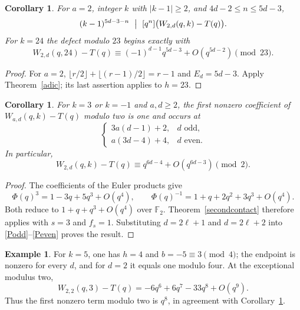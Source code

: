 \documentclass[11pt]{amsart}
\newtheorem{corollary}[theorem]{Corollary}
\theoremstyle{definition}
\newtheorem{example}[theorem]{Example}
\theoremstyle{remark}
\numberwithin{equation}{section}
\begin{document}
\begin{corollary}\label{leveltwoadic}
For $a=2$, integer $k$ with $|k-1|\ge2$, and $4d-2\le n\le5d-3$,
\[
 (k-1)^{5d-3-n}\ \bigm|\ [q^n]\bigl(W_{2,d}(q,k)-T(q)\bigr).
\]
For $k=24$ the defect modulo $23$ begins exactly with
\[
 W_{2,d}(q,24)-T(q)\equiv(-1)^{d-1}q^{5d-3}+O(q^{5d-2})\pmod{23}.
\]
\end{corollary}
\begin{proof}
For $a=2$, $\lfloor r/2\rfloor+\lfloor(r-1)/2\rfloor=r-1$ and $E_d=5d-3$. Apply Theorem~\ref{adic}; its last assertion applies to $h=23$.
\end{proof}

\begin{corollary}\label{modtwoendpoint}
For $k=3$ or $k=-1$ and $a,d\ge2$, the first nonzero coefficient of
$W_{a,d}(q,k)-T(q)$ modulo two is one and occurs at
\[
 \begin{cases}
 3a(d-1)+2,&d\text{ odd},\\
 a(3d-4)+4,&d\text{ even}.
 \end{cases}
\]
In particular,
\[
 W_{2,d}(q,k)-T(q)\equiv q^{6d-4}+O(q^{6d-3})\pmod2.
\]
\end{corollary}
\begin{proof}
The coefficients of the Euler products give
\[
 \Phi(q)^3=1-3q+5q^3+O(q^4),\qquad
 \Phi(q)^{-1}=1+q+2q^2+3q^3+O(q^4).
\]
Both reduce to $1+q+q^3+O(q^4)$ over $\mathbb F_2$. Theorem~\ref{secondcontact}
therefore applies with $s=3$ and $f_s=1$. Substituting
$d=2\ell+1$ and $d=2\ell+2$ into \eqref{Podd}--\eqref{Peven} proves the result.
\end{proof}

\begin{example}\label{evenmodulus}
For $k=5$, one has $h=4$ and $b=-5\equiv3\pmod4$; the endpoint is nonzero
for every $d$, and for $d=2$ it equals one modulo four. At the exceptional
modulus two,
\[
 W_{2,2}(q,3)-T(q)=-6q^6+6q^7-33q^8+O(q^9).
\]
Thus the first nonzero term modulo two is $q^8$, in agreement with
Corollary~\ref{modtwoendpoint}.
\end{example}
\end{document}
